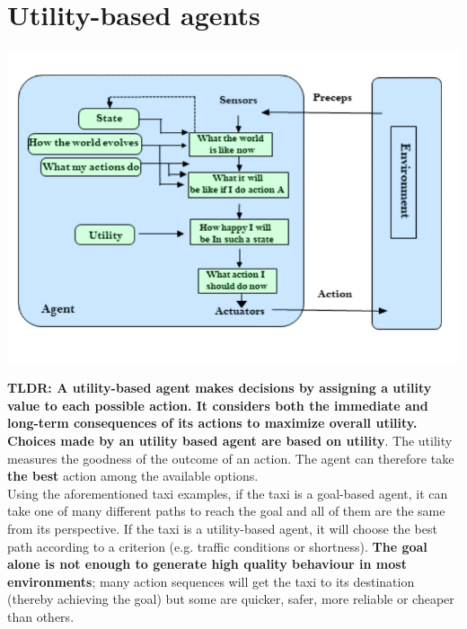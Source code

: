 \documentclass{article}
\begin{document}
\newpage

\section{Utility-based agents}

\begin{center}
    \includegraphics[scale=0.4]{images/utility_based_agent.jpg}
\end{center}

\textbf{TLDR: A utility-based agent makes decisions by assigning a utility value to each possible action. It considers both the immediate and long-term consequences of its actions to maximize overall utility.} \\

\textbf{Choices made by an utility based agent are based on utility}. The utility measures the goodness of the outcome of an action. The agent can therefore take \textbf{the best} action among the available options. \\

Using the aforementioned taxi examples, if the taxi is a goal-based agent, it can take one of many different paths to reach the goal and all of them are the same from its perspective. If the taxi is a utility-based agent, it will choose the best path according to a criterion (e.g. traffic conditions or shortness). \textbf{The goal alone is not enough to generate high quality behaviour in most environments}; many action sequences will get the taxi to its destination (thereby achieving the goal) but some are quicker, safer, more reliable or cheaper than others. \\
\end{document}

